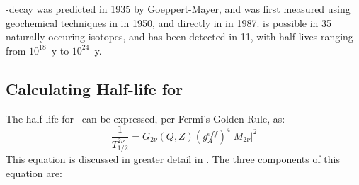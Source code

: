 \documentclass[/main.tex]{subfiles}
\begin{document}
\bb -decay was predicted in 1935 by Goeppert-Mayer\cite{GoeppertMayer1935}, and was first measured using geochemical techniques in  in 1950\cite{Inghram1950}, and directly in  in 1987\cite{Elliott1987}.
\tnbb is possible in 35 naturally occuring isotopes, and has been detected in 11, with half-lives ranging from $10^{18}$~y to $10^{24}$~y\cite{Saakyan2013}.

\subsection{Calculating Half-life for \tnbb}
The half-life for \tnbb\ can be expressed, per Fermi's Golden Rule, as:
\begin{equation} \label{eq:2nvvHL}
  \frac{1}{T^{2\nu}_{1/2}}=G_{2\nu}(Q,Z)(g^{eff}_A)^4|M_{2\nu}|^2
\end{equation}
This equation is discussed in greater detail in \cite{Saakyan2013, Engel2017}.
The three components of this equation are:
\end{document}
